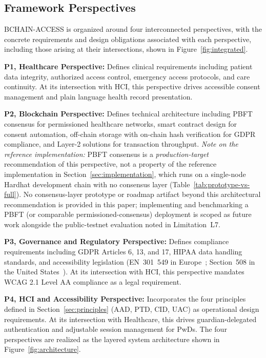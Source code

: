 \documentclass[journal,onecolumn]{IEEEtran}
\begin{document}
\subsection{Framework Perspectives}

BCHAIN-ACCESS is organized around four interconnected perspectives, with the concrete requirements and design obligations associated with each perspective, including those arising at their intersections, shown in Figure~\ref{fig:integrated}.

\textbf{P1, Healthcare Perspective:} Defines clinical requirements including patient data integrity, authorized access control, emergency access protocols, and care continuity. At its intersection with HCI, this perspective drives accessible consent management and plain language health record presentation.

\textbf{P2, Blockchain Perspective:} Defines technical architecture including PBFT consensus for permissioned healthcare networks, smart contract design for consent automation, off-chain storage with on-chain hash verification for GDPR compliance, and Layer-2 solutions for transaction throughput. \emph{Note on the reference implementation:} PBFT consensus is a \emph{production-target} recommendation of this perspective, not a property of the reference implementation in Section~\ref{sec:implementation}, which runs on a single-node Hardhat development chain with no consensus layer (Table~\ref{tab:prototype-vs-full}). No consensus-layer prototype or roadmap artifact beyond this architectural recommendation is provided in this paper; implementing and benchmarking a PBFT (or comparable permissioned-consensus) deployment is scoped as future work alongside the public-testnet evaluation noted in Limitation~L7.

\textbf{P3, Governance and Regulatory Perspective:} Defines compliance requirements including GDPR Articles 6, 13, and 17, HIPAA data handling standards, and accessibility legislation (EN~301~549 in Europe~\cite{en301549}; Section~508 in the United States~\cite{section508}). At its intersection with HCI, this perspective mandates WCAG 2.1 Level AA compliance as a legal requirement.

\textbf{P4, HCI and Accessibility Perspective:} Incorporates the four principles defined in Section~\ref{sec:principles} (AAD, PTD, CID, UAC) as operational design requirements. At its intersection with Healthcare, this drives guardian-delegated authentication and adjustable session management for PwDs. The four perspectives are realized as the layered system architecture shown in Figure~\ref{fig:architecture}.
\end{document}
